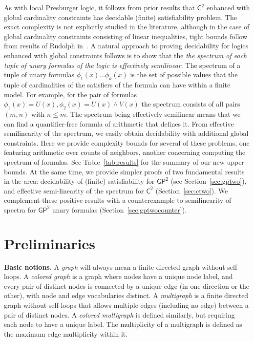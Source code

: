 \documentclass[10pt,a4paper]{article}
\theoremstyle{definition}
\theoremstyle{remark}
\newcommand{\myparagraph}[1]{\medskip\noindent \textbf{#1.}}
\newcommand{\Ctwo}    {\mathsf{C^2}}
\newcommand{\GPtwo}   {\mathsf{GP^2}}
\begin{document}
As with local Presburger logic, it follows from prior results  that $\Ctwo$ enhanced with global cardinality constraints has decidable (finite) satisfiability problem.
The exact complexity is not explicitly studied in the literature,  although in the case of global cardinality constraints consisting of linear inequalities, tight bounds follow from results of Rudolph in~\cite{rudolphcardinality}.    A natural approach to proving decidability for logics
enhanced with global constraints follows is to show that the \emph{the spectrum of each tuple of unary formulas of the logic is effectively semilinear}. The spectrum of a tuple of unary formulas $\phi_1(x) \ldots \phi_k(x)$ is the set of possible values that the tuple of cardinalities of the satisfiers of the formula can have within a finite model. For example, for the pair of formulas $\phi_1(x)=U(x), \phi_2(x)= U(x) \wedge V(x)$ the spectrum consists of all pairs $(m, n)$ with $n \leq m$. The spectrum being effectively semilinear means that we can find a quantifier-free formula of arithmetic that defines it. From effective semilinearity of the spectrum, we easily obtain decidability with additional global constraints.
Here we provide  complexity bounds for several of these problems, one featuring  arithmetic over counts of neighbors, another concerning computing the spectrum of formulas. 
See Table~\ref{tab:results} for the summary of our new upper bounds.
At the same time, we provide simpler proofs of two fundamental results in the area: decidability of (finite) satisfiability for $\GPtwo$ (see Section~\ref{sec:gptwo}), and effective semi-linearity of the spectrum for $\Ctwo$ (Section~\ref{sec:ctwo}). We complement these positive results with a counterexample to semilinearity of spectra for $\GPtwo$ unary formulas (Section~\ref{sec:gptwocounter}).

\section{Preliminaries} \label{sec:prelims}

\myparagraph{Basic notions} A \emph{graph} will always mean a finite directed graph without self-loops.
A \emph{colored graph} is a graph where nodes have a unique node label, and every pair of distinct nodes is connected by a unique edge (in one direction or the other), with node and edge vocabularies distinct.
A \emph{multigraph} is a finite directed graph without self-loops that allows multiple edges (including no edge) between a pair of distinct nodes.
A \emph{colored multigraph} is defined similarly, but requiring each node to have a unique label.
The multiplicity of a multigraph is defined as the maximum edge multiplicity within it.
\end{document}
